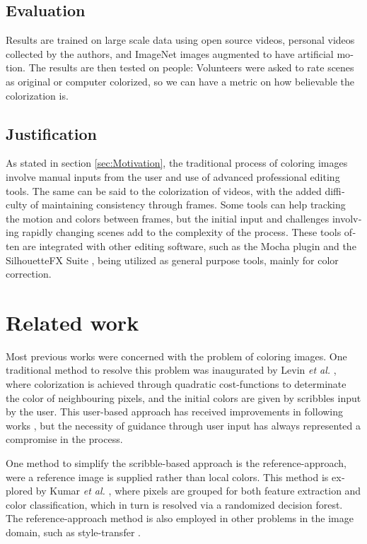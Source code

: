 \documentclass[12pt,openright,oneside,a4paper,english]{abntex2}
\begin{document}
\begin{otherlanguage}{english}
    \section{Evaluation}
    Results are trained on large scale data using open source videos, personal videos collected by the authors, and ImageNet images augmented to have artificial motion. The results are then tested on people: Volunteers were asked to rate scenes as original or computer colorized, so we can have a metric on how believable the colorization is.

    \section{Justification}
    As stated in section \ref{sec:Motivation}, the traditional process of coloring images involve manual inputs from the user and use of advanced professional editing tools.
    The same can be said to the colorization of videos, with the added difficulty of maintaining consistency through frames. Some tools can help tracking the motion and colors between frames, but the initial input and challenges involving rapidly changing scenes add to the complexity of the process. These tools often are integrated with other editing software, such as the Mocha plugin \cite{mocha} and the SilhouetteFX Suite \cite{silhoutte}, being utilized as general purpose tools, mainly for color correction.

    \chapter{Related work}
    Most previous works were concerned with the problem of coloring images. One traditional method to resolve this problem was inaugurated by Levin  \textit{et al.} \cite{Levin2004},
    where colorization is achieved through quadratic cost-functions to determinate the color of neighbouring pixels, and the initial colors are given by scribbles input by the user. This user-based approach has received improvements in following works \cite{Huang2005} \cite{Kumar2012},
    but the necessity of guidance through user input has always represented a compromise in the process.

    One method to simplify the scribble-based approach is the reference-approach, were a reference image is supplied rather than local colors. This method is explored by Kumar \textit{et al.} \cite{Kumar2012},
    where pixels are grouped for both feature extraction and color classification, which in turn is resolved via a randomized decision forest. The reference-approach method is also employed in other problems in the image domain, such as style-transfer \cite{Ruder2016}.


\end{otherlanguage}
\end{document}
